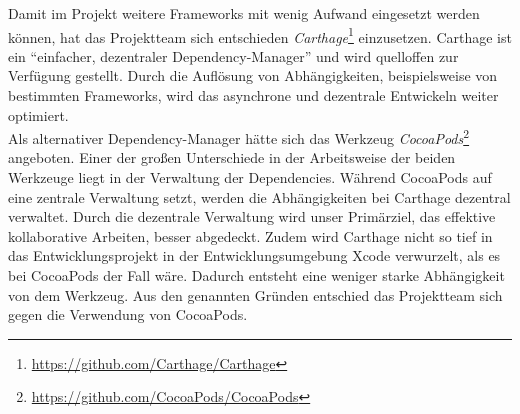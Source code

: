 Damit im Projekt weitere Frameworks mit wenig Aufwand eingesetzt werden können, hat das Projektteam sich entschieden \emph{Carthage}\footnote{\url{https://github.com/Carthage/Carthage}} einzusetzen. Carthage ist ein \enquote{einfacher, dezentraler Dependency-Manager} und wird quelloffen zur Verfügung gestellt. Durch die Auflösung von Abhängigkeiten, beispielsweise von bestimmten Frameworks, wird das asynchrone und dezentrale Entwickeln weiter optimiert. \\
Als alternativer Dependency-Manager hätte sich das Werkzeug \emph{CocoaPods}\footnote{\url{https://github.com/CocoaPods/CocoaPods}} angeboten. Einer der großen Unterschiede in der Arbeitsweise der beiden Werkzeuge liegt in der Verwaltung der Dependencies. Während CocoaPods auf eine zentrale Verwaltung setzt, werden die Abhängigkeiten bei Carthage dezentral verwaltet. Durch die dezentrale Verwaltung wird unser Primärziel, das effektive kollaborative Arbeiten, besser abgedeckt. Zudem wird Carthage nicht so tief in das Entwicklungsprojekt in der Entwicklungsumgebung Xcode verwurzelt, als es bei CocoaPods der Fall wäre. Dadurch entsteht eine weniger starke Abhängigkeit von dem Werkzeug. Aus den genannten Gründen entschied das Projektteam sich gegen die Verwendung von CocoaPods. 



